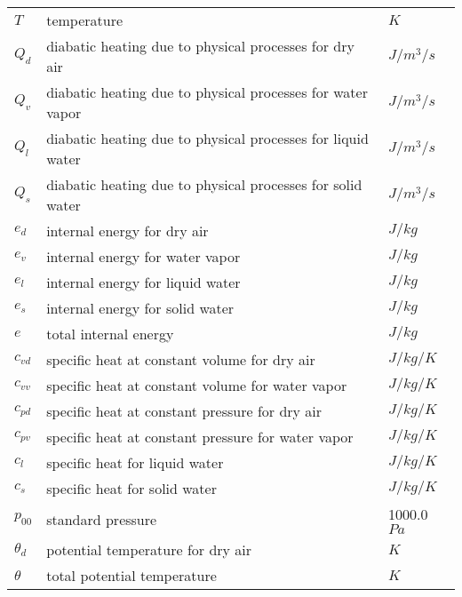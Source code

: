 \begin{table}[htbp]
\begin{tabular}{lll}
    $T$   & temperature                                          & $K$ \\
    $Q_d$   & diabatic heating due to physical processes for dry air  & $J/m^3/s$ \\
    $Q_v$   & diabatic heating due to physical processes for water vapor  & $J/m^3/s$ \\
    $Q_l$   & diabatic heating due to physical processes for liquid water  & $J/m^3/s$ \\
    $Q_s$   & diabatic heating due to physical processes for solid water  & $J/m^3/s$ \\
    $e_d$   & internal energy for dry air  & $J/kg$ \\
    $e_v$   & internal energy for water vapor  & $J/kg$ \\
    $e_l$   & internal energy for liquid water & $J/kg$ \\
    $e_s$   & internal energy for solid water & $J/kg$ \\
    $e$   & total internal energy & $J/kg$ \\
    $c_{vd}$   & specific heat at constant volume for dry air & $J/kg/K$ \\
    $c_{vv}$   & specific heat at constant volume for water vapor & $J/kg/K$ \\
    $c_{pd}$   & specific heat at constant pressure for dry air & $J/kg/K$ \\
    $c_{pv}$   & specific heat at constant pressure for water vapor & $J/kg/K$ \\
    $c_l$   & specific heat for liquid water & $J/kg/K$ \\
    $c_s$   & specific heat for solid water & $J/kg/K$ \\
    $p_{00}$   & standard pressure & 1000.0 $Pa$ \\
    $\theta_d $   & potential temperature for dry air&  $K$ \\
    $\theta $   & total potential temperature&  $K$ \\
    \hline
  \end{tabular}
\end{table}
